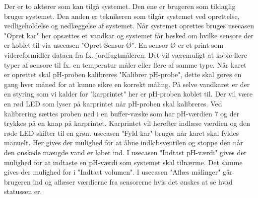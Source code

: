 Der er to aktører som kan tilgå systemet. Den ene er brugeren som tildaglig bruger systemet. Den anden er teknikeren som tilgår systemet ved oprettelse, vedligeholdelse og nedlæggelse af systemet. Når systemet oprettes bruges usecasen "Opret kar" her opsættes et vandkar og systemet får besked om hvilke sensore der er koblet til via usecasen "Opret Sensor Ø". En sensor Ø er et print som videreformidler dataen fra fx. jordfugtmåleren. Det vil væremuligt at koble flere typer af sensore til fx. en temperatur måler eller flere af samme type. Når karet er oprettet skal pH-proben kalibreres "Kalibrer pH-probe", dette skal gøres en gang hver måned for at kunne sikre en korrekt måling. På selve vandkaret er der en styring som vi kalder for "karprintet" her er pH-proben koblet til. Der vil være en rød LED som lyser på karprintet når pH-proben skal kalibreres. Ved kalibrering sættes proben ned i en buffer-væske som har pH-værdien 7 og der trykkes på en knap på karprintet. Karprintet vil herefter indlæse værdien og den røde LED skifter til en grøn. usecasen "Fyld kar" bruges når karet skal fyldes manuelt. Her gives der mulighed for at åbne indløbsventilen og stoppe den når den ønskede mængde vand er løbet ind. I usecasen "Indtast pH-værdi" gives der mulighed for at indtaste en pH-værdi som systemet skal tilnærme. Det samme gives der mulighed for i "Indtast volumen". I usecasen "Aflæs målinger" går brugeren ind og aflæser værdierne fra sensorerne hvis det ønskes at se hvad statussen er.   